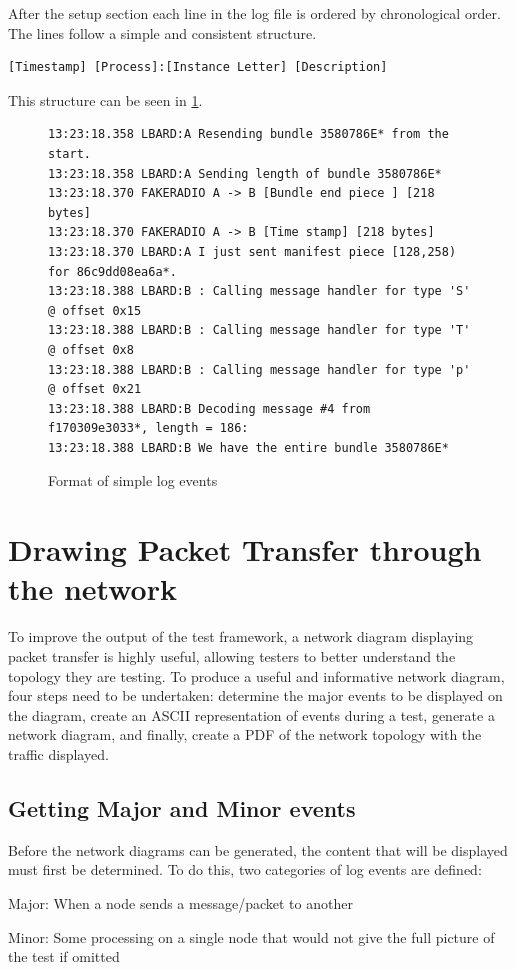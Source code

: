 After the setup section each line in the log file is ordered by chronological order. 
The lines follow a simple and consistent structure.
\begin{center}
    \begin{lstlisting}[basicstyle=\small, breaklines]
[Timestamp] [Process]:[Instance Letter] [Description]
    \end{lstlisting}
\end{center}

This structure can be seen in \figurename{ \ref{fig:chapter5SimpleLogFormat}}.
\begin{figure}
    \begin{centering}
\begin{lstlisting}[basicstyle=\small, breaklines, frame=single]
13:23:18.358 LBARD:A Resending bundle 3580786E* from the start.
13:23:18.358 LBARD:A Sending length of bundle 3580786E* 
13:23:18.370 FAKERADIO A -> B [Bundle end piece ] [218 bytes]
13:23:18.370 FAKERADIO A -> B [Time stamp] [218 bytes]
13:23:18.370 LBARD:A I just sent manifest piece [128,258) for 86c9dd08ea6a*.
13:23:18.388 LBARD:B : Calling message handler for type 'S' @ offset 0x15
13:23:18.388 LBARD:B : Calling message handler for type 'T' @ offset 0x8
13:23:18.388 LBARD:B : Calling message handler for type 'p' @ offset 0x21
13:23:18.388 LBARD:B Decoding message #4 from f170309e3033*, length = 186:
13:23:18.388 LBARD:B We have the entire bundle 3580786E*    
\end{lstlisting}
        \caption{Format of simple log events}
        \label{fig:chapter5SimpleLogFormat}
    \end{centering}
\end{figure}


\section{Drawing Packet Transfer through the network}
To improve the output of the test framework, a network diagram displaying packet transfer is highly useful, allowing testers to better understand the topology they are testing. 
To produce a useful and informative network diagram, four steps need to be undertaken: determine the major events to be displayed on the diagram, create an ASCII representation of events during a test, generate a network diagram, and finally, create a PDF of the network topology with the traffic displayed.

\subsection{Getting Major and Minor events}
Before the network diagrams can be generated, the content that will be displayed must first be determined.
To do this, two categories of log events are defined: 
\begin{list}{}{}
    \item Major: When a node sends a message/packet to another
    \item Minor: Some processing on a single node that would not give the full picture of the test if omitted
\end{list}

